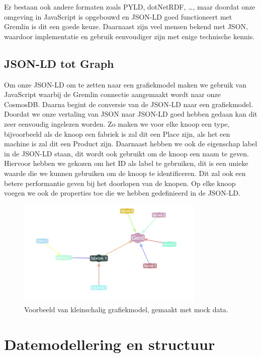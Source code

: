 Er bestaan ook andere formaten zoals PYLD, dotNetRDF, \dots, maar doordat onze omgeving in JavaScript is opgebouwd en JSON-LD goed functioneert met Gremlin is dit een goede keuze.
Daarnaast zijn veel mensen bekend met JSON, waardoor implementatie en gebruik eenvoudiger zijn met enige technische kennis.

\subsection{JSON-LD tot Graph}
Om onze JSON-LD om te zetten naar een grafiekmodel maken we gebruik van JavaScript waarbij de Gremlin connectie aangemaakt wordt naar onze CosmosDB.\@
Daarna begint de conversie van de JSON-LD naar een grafiekmodel. Doordat we onze vertaling van JSON naar JSON-LD goed hebben gedaan kan dit zeer eenvoudig ingelezen worden.
Zo maken we voor elke knoop een type, bijvoorbeeld als de knoop een fabriek is zal dit een Place zijn, als het een machine is zal dit een Product zijn.
Daarnaast hebben we ook de eigenschap label in de JSON-LD staan, dit wordt ook gebruikt om de knoop een naam te geven.
Hiervoor hebben we gekozen om het ID als label te gebruiken, dit is een unieke waarde die we kunnen gebruiken om de knoop te identificeren.
Dit zal ook een betere performantie geven bij het doorlopen van de knopen. Op elke knoop voegen we ook de properties toe die we hebben gedefinieerd in de JSON-LD.\@

\begin{figure}[H]
     \centering
     \includegraphics[width=0.8\textwidth]{./img/grapmodel_example.png}
     \caption[Voorbeeld Grafiekmodel.]{\label{fig:graphmodel}Voorbeeld van kleinschalig grafiekmodel, gemaakt met mock data.}
\end{figure}

\section{Datemodellering en structuur}
